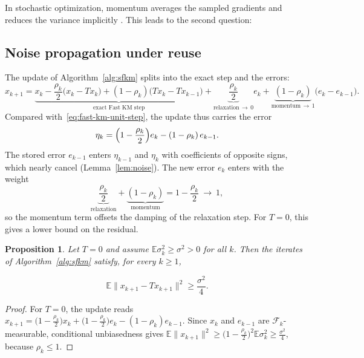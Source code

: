 \documentclass[10pt,draft]{article}
\numberwithin{equation}{section}
\newtheorem{proposition}[theorem]{Proposition}
\theoremstyle{definition}
\theoremstyle{remark}
\begin{document}
In stochastic optimization, momentum averages the sampled gradients and
reduces the variance implicitly \cite{cutkosky2020momentum,gao2024polyak}.
This leads to the second question:

\subsection{Noise propagation under reuse}\label{sec:implicit-vr}

The update of Algorithm~\ref{alg:sfkm} splits into the exact step and the errors:
\[
 x_{k+1}=\underbrace{x_k-\frac{\rho_k}{2}\bigl(x_k-Tx_k\bigr)+(1-\rho_k)\bigl(Tx_k-Tx_{k-1}\bigr)}_{\text{exact Fast KM step}}
 +\underbrace{\frac{\rho_k}{2}}_{\text{relaxation}\,\to\,0}e_k
 +\underbrace{(1-\rho_k)}_{\text{momentum}\,\to\,1}\bigl(e_k-e_{k-1}\bigr).
\]
Compared with~\eqref{eq:fast-km-unit-step}, the update thus carries the error
\begin{equation}\label{eq:perturbed-recurrence}
 \eta_k=\Bigl(1-\frac{\rho_k}{2}\Bigr)e_k-(1-\rho_k)\,e_{k-1}.
\end{equation}
The stored error $e_{k-1}$ enters $\eta_{k-1}$ and $\eta_k$ with coefficients of opposite signs, which nearly cancel (Lemma~\ref{lem:noise}). The new error $e_k$ enters with the weight
\[
\underbrace{\frac{\rho_k}{2}}_{\text{relaxation}}+\underbrace{(1-\rho_k)}_{\text{momentum}}=1-\frac{\rho_k}{2}\ \to\ 1,
\]
so the momentum term offsets the damping of the relaxation step. For $T=0$, this gives a lower bound on the residual.

\begin{proposition}\label{prop:fixed} Let $T=0$ and assume $\mathbb{E}\sigma_k^2\geq\sigma^2>0$ for all $k$. Then the iterates of Algorithm~\ref{alg:sfkm} satisfy, for every $k\geq1$,

\[
\mathbb{E}\lVert x_{k+1}-Tx_{k+1}\rVert^2\geq\frac{\sigma^2}{4}.
\]

\end{proposition}

\begin{proof} For $T=0$, the update reads $x_{k+1}=\bigl(1-\frac{\rho_k}{2}\bigr)x_k+\bigl(1-\frac{\rho_k}{2}\bigr)e_k-(1-\rho_k)e_{k-1}$. Since $x_k$ and $e_{k-1}$ are $\mathcal{F}_k$-measurable, conditional unbiasedness gives $\mathbb{E}\lVert x_{k+1}\rVert^2\geq\bigl(1-\frac{\rho_k}{2}\bigr)^2\mathbb{E}\sigma_k^2\geq\frac{\sigma^2}{4}$, because $\rho_k\leq1$. \end{proof}
\end{document}
